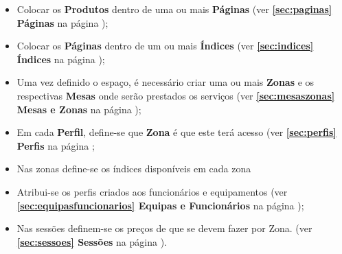 \documentclass[a4paper,11pt,openany]{memoir}
\newcommand*\keystroke[1]{%
  \tikz[baseline=(key.base)]
    \node[%
      draw,
      fill=white,
      drop shadow={shadow xshift=0.25ex,shadow yshift=-0.25ex,fill=black,opacity=0.75},
      rectangle,
      rounded corners=2pt,
      inner sep=1pt,
      line width=0.5pt,
      font=\scriptsize\sffamily
    ](key) {#1\strut}
  ;
}
\begin{document}
\begin{itemize}
\item Colocar os \textbf{Produtos} dentro de uma ou mais \textbf{Páginas}  (ver \textbf{\ref{sec:paginas} Páginas} na página \pageref{sec:paginas});

\item Colocar os \textbf{Páginas} dentro de um ou mais \textbf{Índices}  (ver \textbf{\ref{sec:indices} Índices} na página \pageref{sec:indices});

\item Uma vez definido o espaço, é necessário criar uma ou mais \textbf{Zonas} e os respectivas \textbf{Mesas} onde serão prestados os serviços (ver \textbf{\ref{sec:mesaszonas} Mesas e Zonas} na página \pageref{sec:mesaszonas});

\item Em cada \textbf{Perfil}, define-se que \textbf{Zona} é que este terá acesso (ver \textbf{\ref{sec:perfis} Perfis} na página \pageref{sec:perfis};


\item Nas zonas define-se os índices disponíveis em cada zona 

\item Atribui-se os perfis criados aos funcionários e equipamentos (ver \textbf{\ref{sec:equipasfuncionarios} Equipas e Funcionários} na página \pageref{sec:equipasfuncionarios});

\item Nas sessões definem-se os preços de que se devem fazer por Zona. (ver \textbf{\ref{sec:sessoes} Sessões} na página \pageref{sec:sessoes}).
\end{itemize}




% 
% 
% 
% 
\end{document}

